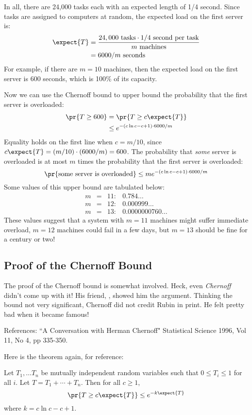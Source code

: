 In all, there are 24,000 tasks each with an expected length of 1/4
second.  Since tasks are assigned to computers at random, the expected
load on the first server is:
\begin{align*}
\expect{T} & = \frac{24,000 \mbox{ tasks} \cdot 1/4 \mbox{ second per task}}
  {m \mbox{ machines}} \\
  & = 6000 / m \mbox{ seconds}
\end{align*}
For example, if there are $m = 10$ machines, then the expected load on
the first server is 600 seconds, which is 100\% of its capacity.

Now we can use the Chernoff bound to upper bound the probability that
the first server is overloaded:
\begin{align*}
\pr{T \geq 600} & = \pr{T \geq c \expect{T}} \\
  & \leq e^{-(c \ln c - c + 1) \cdot 6000 / m}
\end{align*}
Equality holds on the first line when $c = m / 10$, since $c \expect{T} =
(m / 10) \cdot (6000 / m) = 600$.  The probability that \emph{some}
server is overloaded is at most $m$ times the probability that the
first server is overloaded:
\[
\pr{\mbox{some server is overloaded}} \leq m e^{-(c \ln c - c + 1) \cdot 6000 / m}
\]
Some values of this upper bound are tabulated below:
\[
\begin{array}{rcll}
m & = & 11: & 0.784\dots \\
m & = & 12: & 0.000999\dots \\
m & = & 13: & 0.0000000760\dots
\end{array}
\]
These values suggest that a system with $m = 11$ machines might suffer
immediate overload, $m = 12$ machines could fail in a few days, but $m
= 13$ should be fine for a century or two!

\subsection{Proof of the Chernoff Bound}

The proof of the Chernoff bound is somewhat involved.  Heck, even
\emph{Chernoff} didn't come up with it!  His friend, , showed him the argument.  Thinking the bound not very
significant, Chernoff did not credit Rubin in print.  He felt pretty
bad when it became famous!
\begin{editingnotes}
 References: ``A Conversation with Herman Chernoff" Statistical
 Science 1996, Vol 11, No 4, pp 335-350.

Here is the theorem again, for reference:

\begin{theorem}
Let $T_1, \dots T_n$ be mutually independent random variables such
that $0 \leq T_i \leq 1$ for all $i$.  Let $T = T_1 + \cdots + T_n$.
Then for all $c \geq 1$,
\[
\pr{T \geq c \expect{T}} \leq e^{- k \expect{T}}
\]
where $k = c \ln c - c + 1$.
\end{theorem}
\end{editingnotes}

